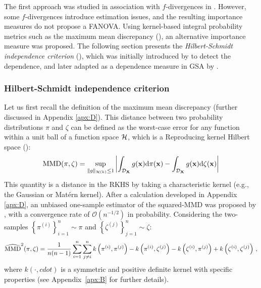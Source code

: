 The first approach was studied in association with $f$-divergences in \citet{daveiga_2015,rahman_2016}. 
However, some $f$-divergences introduce estimation issues, and the resulting importance measures do not propose a FANOVA.  
Using kernel-based integral probability metrics such as the maximum mean discrepancy (), an alternative importance measure was proposed.  
The following section presents the \textit{Hilbert-Schmidt independence criterion} (), which was initially introduced by \citet{gretton_2006} to detect the dependence, and later adapted as a dependence measure in GSA by \citet{daveiga_2015}. 


\subsubsection{Hilbert-Schmidt independence criterion}

Let us first recall the definition of the maximum mean discrepancy (further discussed in Appendix \ref{apx:D}). 
This distance between two probability distributions $\pi$ and $\zeta$ can be defined as the worst-case error for any function within a unit ball of a function space $\mathcal{H}$, which is a Reproducing kernel Hilbert space ():
\begin{equation}
    \mathrm{MMD}(\pi, \zeta) = \sup_{\lVert g \lVert_{\mathcal{H}(k)} \leq 1} \left | \int_{\mathcal{D}_{{\bf X}}} g({\bf x}) \mathrm{d} \pi({\bf x}) - \int_{\mathcal{D}_{{\bf X}}} g({\bf x}) \mathrm{d} \zeta({\bf x}) \right | 
    \label{eq:mmd_chapter1}  
\end{equation}
This quantity is a distance in the RKHS by taking a characteristic kernel (e.g., the Gaussian or Matérn kernel). 
After a calculation developed in Appendix \ref{apx:D}, an unbiased one-sample estimator of the squared-MMD was proposed by \citet{gretton_2006}, 
with a convergence rate of $\mathcal{O}(n^{-1/2})$ in probability. 
Considering the two-samples $\left\{\pi^{(i)}\right\}_{i=1}^n \sim \pi$ and $\left\{\zeta^{(j)}\right\}_{j=1}^n \sim \zeta$: 
\begin{equation}
    \widehat{\mathrm{MMD}}^2(\pi, \zeta) = \frac{1}{n (n-1)} \sum_{i=1}^{n} \sum_{j \neq i}^{n} 
                                k\left(\pi^{(i)}, \pi^{(j)}\right) - k\left(\pi^{(i)}, \zeta^{(j)}\right) - k\left(\zeta^{(i)}, \pi^{(j)}\right) + k\left(\zeta^{(i)}, \zeta^{(j)}\right) \, , 
\label{eq:mmd_ustat}
\end{equation}
where $k(\cdot, cdot)$ is a symmetric and positive definite kernel with specific properties (see Appendix~\ref{apx:B} for further details).

